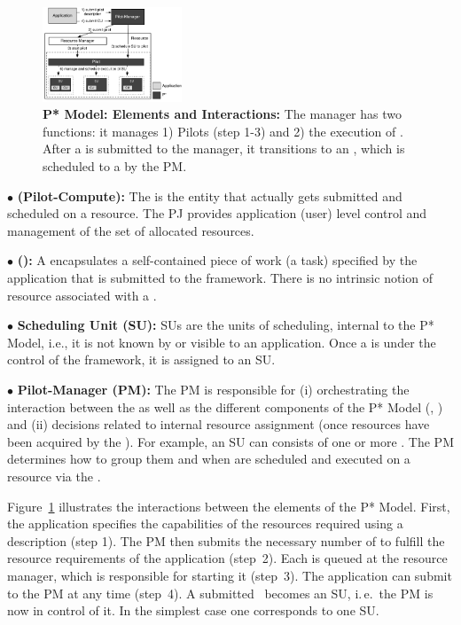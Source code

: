 \documentclass{sig-alternate}
\begin{document}
\begin{figure}[t]
	\upp\upp
    \centering
    \includegraphics[width=0.37\textwidth]{figures/pstar_model_single.pdf}
    \caption{ \textbf{P* Model: Elements and
        Interactions:} The manager has two functions: it manages 1)
      Pilots (step 1-3) and 2) the execution of \cus. After a \cu is
      submitted to the manager, it transitions to an \su, which is
      scheduled to a \pilot by the PM.}
	\upp\upp
    \label{fig:figures_pstar}
\end{figure}


\noindent$\bullet$ \textbf{\pilot (Pilot-Compute):} The \pilot is the
  entity that actually gets submitted and scheduled on a resource.
  The PJ provides application (user)
  level control and management of the set of allocated resources.



\noindent$\bullet$ \textbf{\computeunit  (\cu):} A \cu  encapsulates a 
  self-contained piece of work (a task) specified by the application that is
  submitted to the \pilotjob framework. There is no intrinsic notion
  of resource associated with a \cu.

\noindent$\bullet$ \textbf{Scheduling Unit (SU):} SUs are the units of 
  scheduling, internal to the P* Model, i.e., it is not known by or
  visible to an application. Once a \cu is
  under the control of the \pilotjob framework, it is assigned
  to an SU.


\noindent$\bullet$ \textbf{Pilot-Manager (PM):} The PM is responsible for (i)
  orchestrating the interaction between the \pilots as well as the
  different components of the P* Model (\cus, \sus) and (ii) decisions
  related to internal resource assignment (once resources have been
  acquired by the \pilotjob).  For example, an SU can consists of one
  or more \cus. %
  The PM determines how to group them and when \sus are scheduled and
  executed on a resource via the \pilot.


Figure~\ref{fig:figures_pstar} illustrates the interactions between the
elements of the P* Model. First, the application specifies the capabilities of
the resources required using a \pilotjob description (step 1). The PM then
submits the necessary number of \pilots to fulfill the resource requirements
of the application (step~2). Each \pilot is queued at the resource manager,
which is responsible for starting it (step~3). The application can
submit \cus to the PM at any time (step~4). A submitted \cu \ becomes an SU,
i.\,e.\ the PM is now in control of it. In the simplest case one \cu  corresponds to one SU. 
\end{document}
